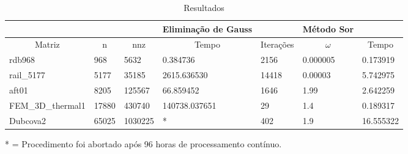 \documentclass[
	article,			%
	11pt,				%
	oneside,			%
	a4paper,			%
	english,			%
	brazil,				%
	sumario=tradicional
	]{abntex2}
\begin{document}
\begin{table}[!h]
\centering
\caption{Resultados}
\label{my-label}
\begin{tabular}{lll|l|lll|}
\cline{4-7}
                                      &                            &                          & Eliminação de Gauss        &                                & Método Sor             &                            \\ \hline
\multicolumn{1}{|c|}{Matriz}          & \multicolumn{1}{c|}{n}     & \multicolumn{1}{c|}{nnz} & \multicolumn{1}{c|}{Tempo} & \multicolumn{1}{c|}{Iterações} & \multicolumn{1}{c|}{$\omega$} & \multicolumn{1}{c|}{Tempo} \\ \hline
\multicolumn{1}{|l|}{rdb968}          & \multicolumn{1}{l|}{968}   & 5632                     & 0.384736                           & \multicolumn{1}{l|}{2156}          & \multicolumn{1}{l|}{0.000005}  & 0.173919                           \\ \hline
\multicolumn{1}{|l|}{rail\_5177}       & \multicolumn{1}{l|}{5177}  & 35185                    & 2615.636530                           & \multicolumn{1}{l|}{14418}          & \multicolumn{1}{l|}{0.00003}  & 5.742975                           \\ \hline
\multicolumn{1}{|l|}{aft01}           & \multicolumn{1}{l|}{8205}  & 125567                   & 66.859452                           & \multicolumn{1}{l|}{1646}          & \multicolumn{1}{l|}{1.99}  & 2.642259                           \\ \hline
\multicolumn{1}{|l|}{FEM\_3D\_thermal1} & \multicolumn{1}{l|}{17880} & 430740                   & 140738.037651                           & \multicolumn{1}{l|}{29}          & \multicolumn{1}{l|}{1.4}  & 0.189317                           \\ \hline
\multicolumn{1}{|l|}{Dubcova2}        & \multicolumn{1}{l|}{65025} & 1030225                  & *                           & \multicolumn{1}{l|}{402}          & \multicolumn{1}{l|}{1.9}  & 16.555322                           \\ \hline
\end{tabular}
\end{table}

* = Procedimento foi abortado após 96 horas de processamento contínuo.
\end{document}
